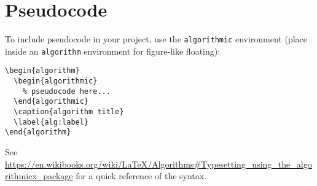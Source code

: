 
\chapter{Pseudocode}
\label{app:pseudocode}

To include pseudocode in your project, use the \texttt{algorithmic} environment (place inside an \texttt{algorithm} environment for figure-like floating):
%
\begin{verbatim}
\begin{algorithm}
  \begin{algorithmic}
    % pseudocode here...
  \end{algorithmic}
  \caption{algorithm title}
  \label{alg:label}
\end{algorithm}
\end{verbatim}



See \url{https://en.wikibooks.org/wiki/LaTeX/Algorithms#Typesetting_using_the_algorithmicx_package} for a quick reference of the syntax.